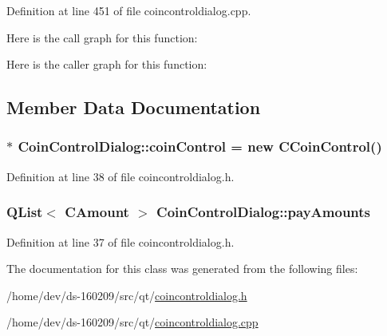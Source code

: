 Definition at line 451 of file coincontroldialog.\+cpp.



Here is the call graph for this function\+:




Here is the caller graph for this function\+:




\subsection{Member Data Documentation}
\hypertarget{class_coin_control_dialog_a9d4514c4fbb1fe19cb3aa121da083bc7}{}
\subsubsection[{coin\+Control}]{ $\ast$ Coin\+Control\+Dialog\+::coin\+Control = new {\bf C\+Coin\+Control}()\hspace{0.3cm}{\ttfamily [static]}}\label{class_coin_control_dialog_a9d4514c4fbb1fe19cb3aa121da083bc7}


Definition at line 38 of file coincontroldialog.\+h.

\hypertarget{class_coin_control_dialog_af4dd184087c7b34ac68392bec2968d15}{}
\subsubsection[{pay\+Amounts}]{\setlength{\rightskip}{0pt plus 5cm}Q\+List$<$ {\bf C\+Amount} $>$ Coin\+Control\+Dialog\+::pay\+Amounts\hspace{0.3cm}{\ttfamily [static]}}\label{class_coin_control_dialog_af4dd184087c7b34ac68392bec2968d15}


Definition at line 37 of file coincontroldialog.\+h.



The documentation for this class was generated from the following files\+:\begin{DoxyCompactItemize}
\item 
/home/dev/ds-\/160209/src/qt/\hyperlink{coincontroldialog_8h}{coincontroldialog.\+h}\item 
/home/dev/ds-\/160209/src/qt/\hyperlink{coincontroldialog_8cpp}{coincontroldialog.\+cpp}\end{DoxyCompactItemize}
